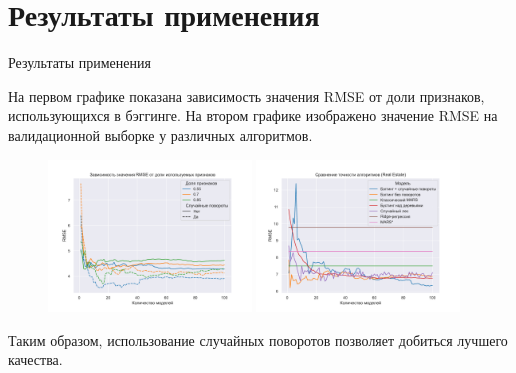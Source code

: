 \documentclass[10pt,pdf,hyperref={unicode}]{beamer}
\begin{document}
\section{Результаты применения}
\begin{frame}{Результаты применения}
\justifying

На первом графике показана зависимость значения RMSE от доли признаков, использующихся в бэггинге. На втором графике изображено значение RMSE на валидационной выборке у различных алгоритмов.
\begin{figure}[h!]
\includegraphics[width=0.48\textwidth]{../figures/be_subsample.pdf}
\includegraphics[width=0.48\textwidth]{../figures/re_valmodels_2.pdf}
\end{figure}

Таким образом, использование случайных поворотов позволяет добиться лучшего качества.

\end{frame}

\end{document}
